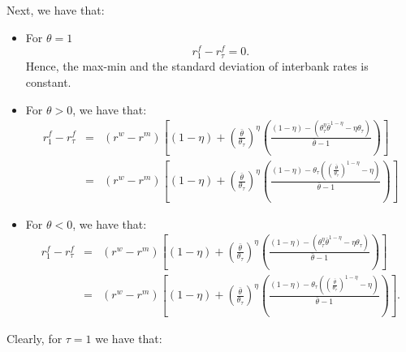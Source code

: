 { Next, we have that:}
\begin{itemize}
\item { For $\theta=1$
\[
r_{1}^{f}-r_{\tau}^{f}=0.
\]
Hence, the max-min and the standard deviation of interbank rates is
constant. }
\item { For $\theta>0$, we have that:
\begin{eqnarray*}
r_{1}^{f}-r_{\tau}^{f} & = & \left(r^{w}-r^{m}\right)\left[(1-\eta)+\left(\frac{\bar{\theta}}{\theta_{\tau}}\right)^{\eta}\left(\frac{\left(1-\eta\right)-\left(\theta_{\tau}^{\eta}\bar{\theta}^{1-\eta}-\eta\theta_{\tau}\right)}{\bar{\theta}-1}\right)\right]\\
 & = & \left(r^{w}-r^{m}\right)\left[(1-\eta)+\left(\frac{\bar{\theta}}{\theta_{\tau}}\right)^{\eta}\left(\frac{\left(1-\eta\right)-\theta_{\tau}\left(\left(\frac{\bar{\theta}}{\theta_{\tau}}\right)^{1-\eta}-\eta\right)}{\bar{\theta}-1}\right)\right]
\end{eqnarray*}
}
\item { For $\theta<0$, we have that:
\begin{eqnarray*}
r_{1}^{f}-r_{\tau}^{f} & = & \left(r^{w}-r^{m}\right)\left[(1-\eta)+\left(\frac{\bar{\theta}}{\theta_{\tau}}\right)^{\eta}\left(\frac{\left(1-\eta\right)-\left(\theta_{\tau}^{\eta}\bar{\theta}^{1-\eta}-\eta\theta_{\tau}\right)}{\bar{\theta}-1}\right)\right]\\
 & = & \left(r^{w}-r^{m}\right)\left[(1-\eta)+\left(\frac{\bar{\theta}}{\theta_{\tau}}\right)^{\eta}\left(\frac{\left(1-\eta\right)-\theta_{\tau}\left(\left(\frac{\bar{\theta}}{\theta_{\tau}}\right)^{1-\eta}-\eta\right)}{\bar{\theta}-1}\right)\right].
\end{eqnarray*}
}
\end{itemize}
{ Clearly, for $\tau=1$ we have that:}

